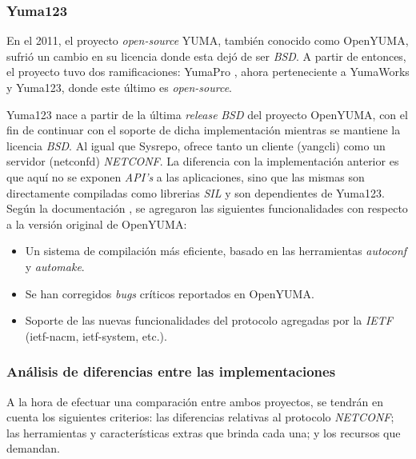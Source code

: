 \subsubsection{Yuma123}
En el 2011, el proyecto \textit{open-source} YUMA, también conocido como OpenYUMA, sufrió un cambio en su licencia donde esta dejó de ser \textit{BSD}. A partir de entonces, el proyecto tuvo dos ramificaciones: YumaPro \parencite{yumapro}, ahora perteneciente a YumaWorks y Yuma123, donde este último es \textit{open-source}. 

Yuma123 nace a partir de la última \textit{release} \textit{BSD} del proyecto OpenYUMA, con el fin de continuar con el soporte de dicha implementación mientras se mantiene la licencia \textit{BSD}. Al igual que Sysrepo, ofrece tanto un cliente (yangcli) como un servidor (netconfd) \textit{NETCONF}. La diferencia con la implementación anterior es que aquí no se exponen \textit{API’s} a las aplicaciones, sino que las mismas son directamente compiladas como librerias \textit{SIL} y son dependientes de Yuma123.
\\

Según la documentación \parencite{yuma123}, se agregaron las siguientes funcionalidades con respecto a la versión original de OpenYUMA:

\begin{itemize}
	\item Un sistema de compilación más eficiente, basado en las herramientas \textit{autoconf} y \textit{automake}.
	\item Se han corregidos \textit{bugs} críticos reportados en OpenYUMA.
	\item Soporte de las nuevas funcionalidades del protocolo agregadas por la \textit{IETF} (ietf-nacm, ietf-system, etc.). 
\end{itemize}

\subsubsection{Análisis de diferencias entre las implementaciones}
A la hora de efectuar una comparación entre ambos proyectos, se tendrán en cuenta los siguientes criterios: las diferencias relativas al protocolo \textit{NETCONF}; las herramientas y características extras que brinda cada una; y los recursos que demandan.


